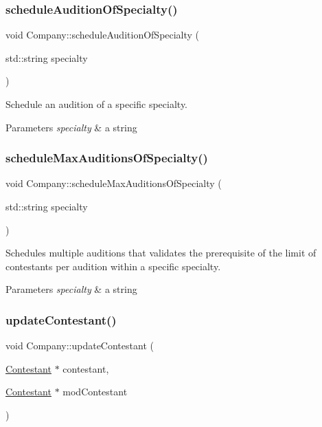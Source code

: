 \subsubsection{\texorpdfstring{schedule\+Audition\+Of\+Specialty()}{scheduleAuditionOfSpecialty()}}
{\footnotesize\ttfamily void Company\+::schedule\+Audition\+Of\+Specialty (\begin{DoxyParamCaption}\item[{std\+::string}]{specialty }\end{DoxyParamCaption})}



Schedule an audition of a specific specialty. 


\begin{DoxyParams}{Parameters}
{\em specialty} & a string \\
\hline
\end{DoxyParams}
\mbox{\label{class_company_a6da20c8e4cdbaa15326fa3c44ec70885}} 
\subsubsection{\texorpdfstring{schedule\+Max\+Auditions\+Of\+Specialty()}{scheduleMaxAuditionsOfSpecialty()}}
{\footnotesize\ttfamily void Company\+::schedule\+Max\+Auditions\+Of\+Specialty (\begin{DoxyParamCaption}\item[{std\+::string}]{specialty }\end{DoxyParamCaption})}



Schedules multiple auditions that validates the prerequisite of the limit of contestants per audition within a specific specialty. 


\begin{DoxyParams}{Parameters}
{\em specialty} & a string \\
\hline
\end{DoxyParams}
\mbox{\label{class_company_a8948265cd00ed452e5336964ef2b5537}} 
\subsubsection{\texorpdfstring{update\+Contestant()}{updateContestant()}}
{\footnotesize\ttfamily void Company\+::update\+Contestant (\begin{DoxyParamCaption}\item[{\hyperlink{class_contestant}{Contestant} $\ast$}]{contestant,  }\item[{\hyperlink{class_contestant}{Contestant} $\ast$}]{mod\+Contestant }\end{DoxyParamCaption})}



